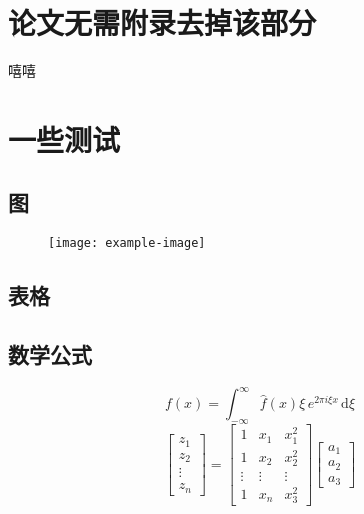 \section{论文无需附录去掉该部分}
嘻嘻
\section{一些测试}
\subsection{图}
\begin{figure}[H]
	\centering
	\texttt{[image: example-image]}
\end{figure}
\subsection{表格}
\begin{table}[H]
	\centering
	\caption{三线表}
\end{table}
\subsection{数学公式}
\[ f(x) = \int_{-\infty}^\infty  \hat f(x)\xi\,e^{2 \pi i \xi x}  \,\mathrm{d}\xi  \]
\begin{equation} 
	\begin{bmatrix}
		z_{1}\\
		z_{2}\\
		\vdots\\
		z_{n}
	\end{bmatrix}
	=\begin{bmatrix}
		1 & x_{1}  &x_{1}^{2}  \\
		1& x_{2} & x_{2}^{2} \\
		\vdots & \vdots & \vdots\\
		1 & x_{n} & x_{3}^{2}
	\end{bmatrix}
	\begin{bmatrix}
		a_{1} \\
		a_{2} \\
		a_{3} 
	\end{bmatrix}
\end{equation}

